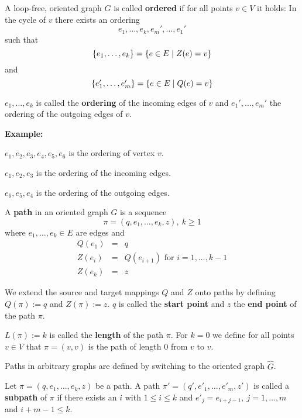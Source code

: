 \begin{definition}
A loop-free, oriented graph $G$ is called {\bf ordered} if for all points
$v \in V$ it	holds: In the cycle of $v$ there exists an ordering 
\[ e_1, \ldots, e_k, e_m', \ldots, e_1'\]
such that
\[ \mbox{$\{e_1, \ldots, e_k\}$} = \mbox{$\{e \in E \mid Z(e) = v\}$} \]
and 
\[ \mbox{$\{e_1', \ldots, e_m'\}$} = \mbox{$\{e \in E \mid Q(e) = v\}$} \]
\end{definition}

$e_1, \ldots, e_k$ is called the {\bf ordering} of the incoming edges of $v$ and
$e_1', \ldots, e_m'$ the ordering of the outgoing edges of $v$.

{\bf Example:}

\begin{center}

\end{center}

$e_1,e_2,e_3,e_4,e_5,e_6$ is the ordering of vertex $v$.

$e_1,e_2,e_3$ is the ordering of the incoming edges.

$e_6,e_5,e_4$ is the ordering of the outgoing edges.

\begin{definition}
A {\bf path} in an oriented graph $G$ is a sequence 
\[ \pi = (q, e_1, \ldots, e_k, z),\ k \geq 1 \]
where $ e_1, \ldots, e_k \in E$ are edges and
\begin{eqnarray*}
Q(e_1) & = & q \\
Z(e_{i}) & = & Q(e_{i+1})\text{ for }i = 1, \ldots, k-1 \\
Z(e_k) & = & z 
\end{eqnarray*}
\end{definition}

We extend the source and target mappings $Q$ and $Z$ onto paths by defining
$Q(\pi) := q$ and $Z(\pi) := z$. $q$ is called the {\bf start point} and $z$ the {\bf end
point} of the path $\pi$.

$L(\pi) := k$ is called the {\bf length} of the path $\pi$. For $k = 0$ we
define for all points $v \in V$ that $\pi = (v, v)$ is the path of length 0 from
$v$ to $v$.

Paths in arbitrary graphs are defined by switching to the oriented graph
$\hat{G}$.

\begin{definition}
Let $\pi = (q, e_1, \ldots, e_k, z)$ be a path. A path $\pi' = (q', e'_1,
\ldots, e'_m, z')$ is called a {\bf subpath} of $\pi$ if there exists an $i$
with $1 \leq i \leq k$ and $e'_j = e_{i+j-1},\ j = 1, \ldots, m$ and $i + m -
1 \leq k$.
\end{definition}

